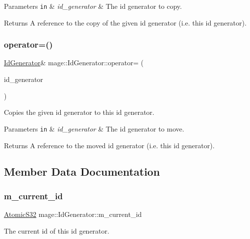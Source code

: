 \begin{DoxyParams}[1]{Parameters}
\mbox{\tt in}  & {\em id\+\_\+generator} & The id generator to copy. \\
\hline
\end{DoxyParams}
\begin{DoxyReturn}{Returns}
A reference to the copy of the given id generator (i.\+e. this id generator). 
\end{DoxyReturn}
\hypertarget{structmage_1_1_id_generator_aace8082947445d26d2421ba8b361f1bc}{}\label{structmage_1_1_id_generator_aace8082947445d26d2421ba8b361f1bc} 
\subsubsection{\texorpdfstring{operator=()}{operator=()}\hspace{0.1cm}{\footnotesize\ttfamily [2/2]}}
{\footnotesize\ttfamily \hyperlink{structmage_1_1_id_generator}{Id\+Generator}\& mage\+::\+Id\+Generator\+::operator= (\begin{DoxyParamCaption}\item[{\hyperlink{structmage_1_1_id_generator}{Id\+Generator} \&\&}]{id\+\_\+generator }\end{DoxyParamCaption})\hspace{0.3cm}{\ttfamily [delete]}}

Copies the given id generator to this id generator.


\begin{DoxyParams}[1]{Parameters}
\mbox{\tt in}  & {\em id\+\_\+generator} & The id generator to move. \\
\hline
\end{DoxyParams}
\begin{DoxyReturn}{Returns}
A reference to the moved id generator (i.\+e. this id generator). 
\end{DoxyReturn}


\subsection{Member Data Documentation}
\hypertarget{structmage_1_1_id_generator_af834ccd6b694775f434949a1c1382965}{}\label{structmage_1_1_id_generator_af834ccd6b694775f434949a1c1382965} 
\subsubsection{\texorpdfstring{m\+\_\+current\+\_\+id}{m\_current\_id}}
{\footnotesize\ttfamily \hyperlink{namespacemage_a34972c09c02b691cd7cc5ea34db1e778}{Atomic\+S32} mage\+::\+Id\+Generator\+::m\+\_\+current\+\_\+id\hspace{0.3cm}{\ttfamily [private]}}

The current id of this id generator. 